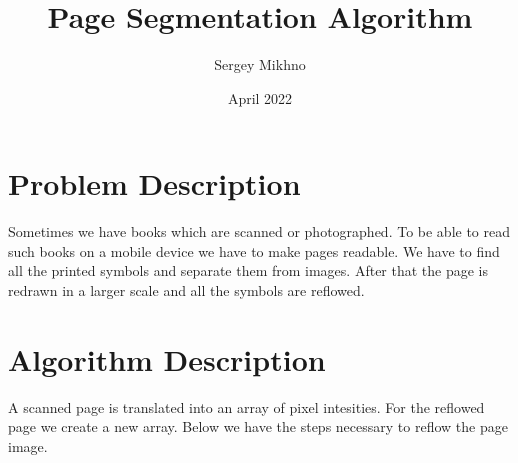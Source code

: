 \documentclass{article}
\title{Page Segmentation Algorithm}
\author{Sergey Mikhno}
\date{April 2022}
\begin{document}
\maketitle


\section{Problem Description}
Sometimes we have books which are scanned or photographed. To be able to read such books on a mobile device we have to make pages readable. We have to find all the printed symbols and separate them from images. After that the page is redrawn in a larger scale and all the symbols are reflowed.

\section{Algorithm Description}

A scanned page is translated into an array of pixel intesities. For the reflowed page we create a new array. Below we have the steps necessary to reflow the page image.
\end{document}
